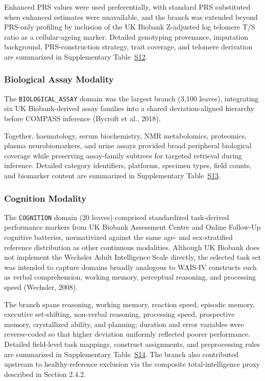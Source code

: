 \documentclass[11pt,a4paper,twoside]{article}
\begin{document}
Enhanced PRS values were used preferentially, with standard PRS substituted when enhanced estimates were unavailable, and the branch was extended beyond PRS-only profiling by inclusion of the UK Biobank Z-adjusted log telomere T/S ratio as a cellular-ageing marker. Detailed genotyping provenance, imputation background, PRS-construction strategy, trait coverage, and telomere derivation are summarized in Supplementary Table~\hyperref[tab:s12]{S12}.

\subsubsection{Biological Assay Modality}
The \texttt{BIOLOGICAL\_{\allowbreak}ASSAY} domain was the largest branch (3,100 leaves), integrating six UK Biobank-derived assay families into a shared deviation-aligned hierarchy before COMPASS inference (Bycroft et al., 2018).

Together, haematology, serum biochemistry, NMR metabolomics, proteomics, plasma neurobiomarkers, and urine assays provided broad peripheral biological coverage while preserving assay-family subtrees for targeted retrieval during inference. Detailed category identifiers, platforms, specimen types, field counts, and biomarker content are summarized in Supplementary Table~\hyperref[tab:s13]{S13}.

\subsubsection{Cognition Modality}
The \texttt{COGNITION} domain (20 leaves) comprised standardized task-derived performance markers from UK Biobank Assessment Centre and Online Follow-Up cognitive batteries, normativized against the same age- and sex-stratified reference distribution as other continuous modalities. Although UK Biobank does not implement the Wechsler Adult Intelligence Scale directly, the selected task set was intended to capture domains broadly analogous to WAIS-IV constructs such as verbal comprehension, working memory, perceptual reasoning, and processing speed (Wechsler, 2008).

The branch spans reasoning, working memory, reaction speed, episodic memory, executive set-shifting, non-verbal reasoning, processing speed, prospective memory, crystallized ability, and planning; duration and error variables were reverse-coded so that higher deviation uniformly reflected poorer performance. Detailed field-level task mappings, construct assignments, and preprocessing rules are summarized in Supplementary Table~\hyperref[tab:s14]{S14}. The branch also contributed upstream to healthy-reference exclusion via the composite total-intelligence proxy described in Section 2.4.2.
\end{document}
